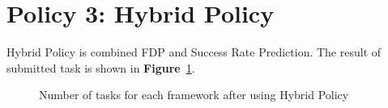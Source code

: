 \documentclass[12pt,oneside,openright,a4paper]{cpe-english-project}
\begin{document}
\section{Policy 3: Hybrid Policy}  
\hspace{10mm}Hybrid Policy is combined FDP and Success Rate Prediction. The result of submitted task is shown in \textbf{Figure}~\ref{fig:task3}.

\begin{figure}[!h]\centering
    \setlength{\fboxrule}{0mm} %
    \setlength{\fboxsep}{0cm}
    \caption{Number of tasks for each framework after using Hybrid Policy}\label{fig:task3}
\end{figure}
\end{document}
